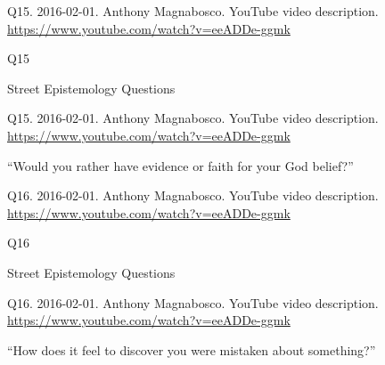 \documentclass[
    src/templates/5x2-on-a4paper,
    frame
]{flashcards}
\newcommand{\myheader}{}
\newcommand{\myfooter}{
    \begin{flushright}
        \small\sc
        Street Epistemology Questions \par
    \end{flushright}
}
\begin{document}
        \renewcommand{\myheader}{
            \normalfont %
            \begin{tiny}
                Q15.
                2016-02-01.
                Anthony Magnabosco.
                    YouTube video description.
                    \\
                    \url{ https://www.youtube.com/watch?v=eeADDe-ggmk }
                \par
            \end{tiny}
        }
        \begin{flashcard}{
            \myheader
            \vspace{\fill}
            \begin{center}
                \large
                    Q15
            \end{center}
            \vspace{\fill}
            \myfooter
            \vspace{-1.4ex}
        }
            \myheader
            \vspace{\fill}
            \begin{center}
                \large
\enquote{Would you rather have evidence or faith for your God belief?}            \end{center}
            \vspace{\fill}
        \end{flashcard}
        \renewcommand{\myheader}{
            \normalfont %
            \begin{tiny}
                Q16.
                2016-02-01.
                Anthony Magnabosco.
                    YouTube video description.
                    \\
                    \url{ https://www.youtube.com/watch?v=eeADDe-ggmk }
                \par
            \end{tiny}
        }
        \begin{flashcard}{
            \myheader
            \vspace{\fill}
            \begin{center}
                \large
                    Q16
            \end{center}
            \vspace{\fill}
            \myfooter
            \vspace{-1.4ex}
        }
            \myheader
            \vspace{\fill}
            \begin{center}
                \large
\enquote{How does it feel to discover you were mistaken about something?}            \end{center}
            \vspace{\fill}
        \end{flashcard}
\end{document}
